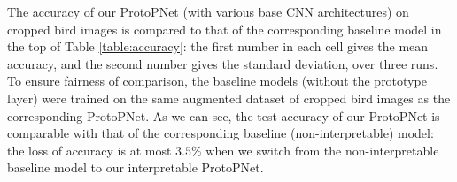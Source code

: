 \documentclass{article}
\theoremstyle{definition}
\theoremstyle{remark}
\begin{document}
The accuracy of our ProtoPNet (with various base CNN architectures) on cropped bird images is compared to that of the corresponding baseline model in the top of Table \ref{table:accuracy}: the first number in each cell gives the mean accuracy, and the second number gives the standard deviation, over three runs.
To ensure fairness of comparison, the baseline models (without the prototype layer) were trained on the same augmented dataset of cropped bird images as the corresponding ProtoPNet. As we can see, the test accuracy of our ProtoPNet is comparable with that of the corresponding baseline (non-interpretable) model: the loss of accuracy is at most $3.5\%$ when we switch from the non-interpretable baseline model to our interpretable ProtoPNet.
\end{document}
